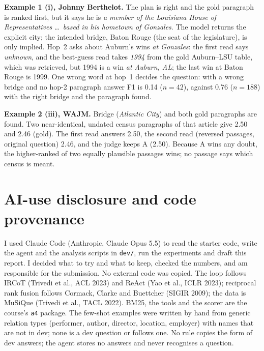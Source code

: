 \documentclass[10pt,a4paper]{article}
\begin{document}
\textbf{Example 1 (i), Johnny Berthelot.} The plan is right and the gold paragraph is ranked first, but it says
he is \emph{a member of the Louisiana House of Representatives \dots\ based in his hometown of Gonzales}. The model
returns the explicit city; the intended bridge, Baton Rouge (the seat of the legislature), is only implied. Hop~2
asks about Auburn's wins \emph{at Gonzales}: the first read says \emph{unknown}, and the best-guess read takes
\emph{1994} from the gold Auburn--LSU table, which was retrieved, but 1994 is a win \emph{at Auburn, AL}; the last
win at Baton Rouge is 1999. One wrong word at hop~1 decides the question: with a wrong bridge and no hop-2 paragraph answer F1 is
0.14 ($n{=}42$), against 0.76 ($n{=}188$) with the right bridge and the paragraph found.

\textbf{Example 2 (iii), WAJM.} Bridge (\emph{Atlantic City}) and both gold paragraphs are found. Two
near-identical, undated census paragraphs of that article give 2.50 and 2.46 (gold). The first read answers 2.50,
the second read (reversed passages, original question) 2.46, and the judge keeps A (2.50). Because A wins any
doubt, the higher-ranked of two equally plausible passages wins; no passage says which census is meant.

\section{AI-use disclosure and code provenance}
I used Claude Code (Anthropic, Claude Opus 5.5) to read the starter code, write the agent and the analysis
scripts in \texttt{dev/}, run the experiments and draft this report. I decided what to try and what to keep,
checked the numbers, and am responsible for the submission. No external code was copied. The loop follows IRCoT
(Trivedi et al., ACL 2023) and ReAct (Yao et al., ICLR 2023); reciprocal rank fusion follows Cormack, Clarke and
Buettcher (SIGIR 2009); the data is MuSiQue (Trivedi et al., TACL 2022). BM25, the tools and the scorer are the
course's \texttt{a4} package. The few-shot examples were written by hand from generic relation types (performer, author,
director, location, employer) with names that are not in dev; none is a dev question or follows one. No rule copies
the form of dev answers; the agent stores no answers and never recognises a question.
\end{document}
